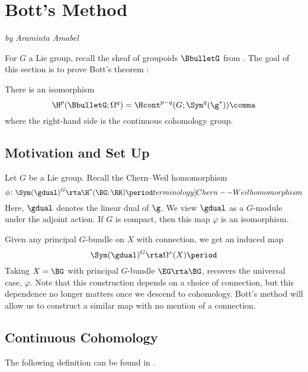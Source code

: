 
\section{Bott's Method}\label{BottsMethod}
\textit{by Araminta Amabel}

For $G$ a Lie group, recall the sheaf of groupoids $\BbulletG$ from . 
The goal of this section is to prove Bott's theorem \cite[Theorem 1]{BottPaper}:

\begin{thm}
	There is an isomorphism
	\[
		\H^{p}(\BbulletG;\Omega^q)=\Hcont^{p-q}(G;\Sym^q(\g^*)) \comma
	\]
	where the right-hand side is the continuous cohomology group.
\end{thm}

\subsection{Motivation and Set Up}
Let $G$ be a Lie group. 
Recall the Chern--Weil homomorphism 
\[
	\phi \colon \Sym(\gdual)^G\rta \H^*(\BG;\RR) \period  \index[terminology]{Chern--Weil homomorphism}
\]
Here, $\gdual$ denotes the linear dual of $\g$. 
We view $\gdual$ as a $G$-module under the adjoint action. 
If $G$ is compact, then this map $\varphi$ is an isomorphism.

Given any principal $G$-bundle on $X$ with connection, we get an induced map
\[
	\Sym(\gdual)^G\rta \Omega^*(X) \period
\]
 Taking $X=\BG$ with principal $G$-bundle $\EG\rta \BG$, recovers the universal case, $\varphi$. Note that this construction depends on a choice of connection, but this dependence no longer matters once we descend to cohomology. Bott's method will allow us to construct a similar map with no mention of a connection.


\subsection{Continuous Cohomology}

The following definition can be found in \cite[\S 2]{MR494071}. 

